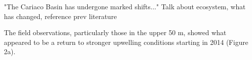 \documentclass[draft]{agujournal2019}
\begin{document}
    "The Cariaco Basin has undergone marked shifts..." Talk about ecosystem, what has changed, reference prev literature

        The field observations, particularly those in the upper 50 m, showed what appeared to be a return to stronger upwelling conditions starting in 2014 (Figure 2a).


\end{document}
